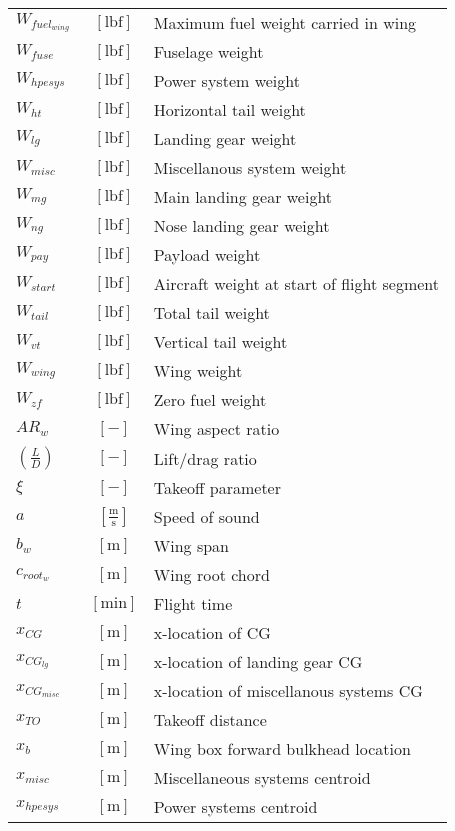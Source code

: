\documentclass[12pt]{article}
\begin{document}
{\begin{supertabular}{lcl}
$W_{fuel_{wing}}$ & $~\mathrm{[lbf]}$ & Maximum fuel weight carried in wing\\
$W_{fuse}$ & $~\mathrm{[lbf]}$ & Fuselage weight \\
$W_{hpesys}$ & $~\mathrm{[lbf]}$ & Power system weight \\
$W_{ht}$ & $~\mathrm{[lbf]}$ & Horizontal tail weight \\
$W_{lg}$ & $~\mathrm{[lbf]}$ & Landing gear weight \\
$W_{misc}$ & $~\mathrm{[lbf]}$ & Miscellanous system weight\\
$W_{mg}$ & $~\mathrm{[lbf]}$ & Main landing gear weight \\
$W_{ng}$ & $~\mathrm{[lbf]}$ & Nose landing gear weight \\
$W_{pay}$ & $~\mathrm{[lbf]}$ & Payload weight \\
$W_{start}$ & $~\mathrm{[lbf]}$ & Aircraft weight at start of flight segment\\
$W_{tail}$ & $~\mathrm{[lbf]}$ & Total tail weight\\
$W_{vt}$ & $~\mathrm{[lbf]}$ & Vertical tail weight \\
$W_{wing}$ & $~\mathrm{[lbf]}$ & Wing weight \\
$W_{zf}$ & $~\mathrm{[lbf]}$ & Zero fuel weight \\
$AR_w$ & $~[-]$ & Wing aspect ratio \\
$\left(\frac{L}{D}\right)$ & $~[-]$ & Lift/drag ratio \\
$\xi$ & $~[-]$ & Takeoff parameter \\
$a$ & $~\mathrm{[\tfrac{m}{s}]}$ & Speed of sound\\
$b_w$ & $~\mathrm{[m]}$ & Wing span \\
$c_{root_{w}}$ & $~\mathrm{[m]}$ & Wing root chord \\
$t$ & $~\mathrm{[min]}$ & Flight time\\
$x_{CG}$ & $~\mathrm{[m]}$ & x-location of CG \\
$x_{CG_{lg}}$ & $~\mathrm{[m]}$ & x-location of landing gear CG \\
$x_{CG_{misc}}$ & $~\mathrm{[m]}$ & x-location of miscellanous systems CG \\
$x_{TO}$ & $~\mathrm{[m]}$ & Takeoff distance \\
$x_{b}$ & $~\mathrm{[m]}$ & Wing box forward bulkhead location \\
$x_{misc}$ & $~\mathrm{[m]}$ & Miscellaneous systems centroid\\
$x_{hpesys}$ & $~\mathrm{[m]}$ & Power systems centroid\\

\end{supertabular}}
\end{document}
